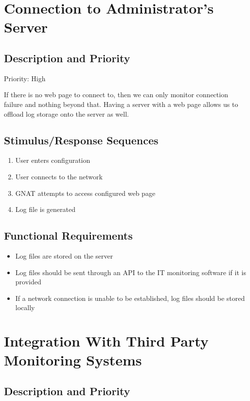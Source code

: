 \documentclass{scrreprt}
\begin{document}
\section{Connection to Administrator's Server}

\subsection{Description and Priority}

Priority: High

If there is no web page to connect to, then we can only monitor connection failure and nothing beyond that. Having a server with a web page allows us to offload log storage onto the server as well.

\subsection{Stimulus/Response Sequences}

\begin{enumerate}
\item User enters configuration
\item User connects to the network
\item GNAT attempts to access configured web page
\item Log file is generated
\end{enumerate}

\subsection{Functional Requirements}

\begin{itemize}
\item Log files are stored on the server
\item Log files should be sent through an API to the IT monitoring software if it is provided
\item If a network connection is unable to be established, log files should be stored locally
\end{itemize}

\section{Integration With Third Party Monitoring Systems}

\subsection{Description and Priority}
\end{document}
